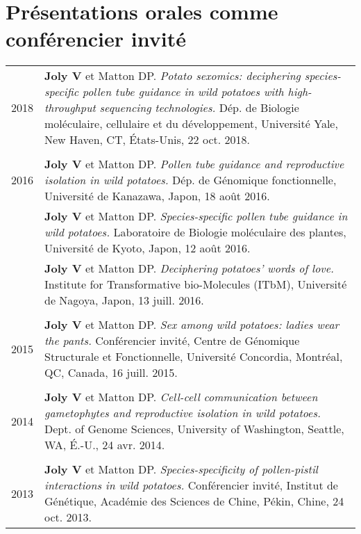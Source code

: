 \documentclass[letterpaper,12pt]{article}
\begin{document}
\vspace{6mm}

\section[Conférencier invité]{Présentations orales \small comme conférencier invité}
\begin{tabularx}{\textwidth}{@{}r|X@{}}

2018
& \textbf{Joly V} et Matton DP.
  \emph{Potato sexomics: deciphering species-specific pollen tube guidance in wild potatoes with high-throughput sequencing technologies.}
  Dép. de Biologie moléculaire, cellulaire et du développement,
  Université Yale, New Haven, CT, États-Unis, 22 oct. 2018.
  \\

\multicolumn{2}{c}{} \\

2016
& \textbf{Joly V} et Matton DP.
  \emph{Pollen tube guidance and reproductive isolation in wild potatoes.}
  Dép. de Génomique fonctionnelle,
  Université de Kanazawa, Japon, 18 août 2016.
  \vspace{1.5mm} \\

& \textbf{Joly V} et Matton DP.
  \emph{Species-specific pollen tube guidance in wild potatoes.}
  Laboratoire de Biologie moléculaire des plantes,
  Université de Kyoto, Japon, 12 août 2016.
  \vspace{1.5mm} \\

& \textbf{Joly V} et Matton DP.
  \emph{Deciphering potatoes’ words of love.}
  Institute for Transformative bio-Molecules (ITbM),
  Université de Nagoya, Japon, 13 juill. 2016.
  \\

\multicolumn{2}{c}{} \\

2015
& \textbf{Joly V} et Matton DP.
  \emph{Sex among wild potatoes: ladies wear the pants.}
  Conférencier invité, Centre de Génomique Structurale et Fonctionnelle, Université Concordia, Montréal, QC, Canada, 16 juill. 2015.
  \\

\multicolumn{2}{c}{} \\

2014
& \textbf{Joly V} et Matton DP.
  \emph{Cell-cell communication between gametophytes and reproductive isolation in wild potatoes.}
  Dept. of Genome Sciences, University of Washington,
  Seattle, WA, É.-U., 24 avr. 2014.
  \\

\multicolumn{2}{c}{} \\

2013
& \textbf{Joly V} et Matton DP.
  \emph{Species-specificity of pollen-pistil interactions in wild potatoes.}
  Conférencier invité, Institut de Génétique, Académie des Sciences de Chine,
  Pékin, Chine, 24 oct. 2013. \\

\end{tabularx}
\end{document}
